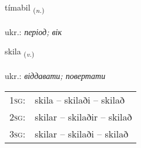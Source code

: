 \documentclass[frontgrid, backgrid]{flacards}\usepackage[]{graphicx}\usepackage[]{xcolor}
\begin{document}
\renewcommand{\flhead}{\vskip5pt \fboxsep=0pt {\small\bfseries\footnotesize Nafnorð | іменник}}
\renewcommand{\fcfoot}{\vskip5pt \fboxsep=0pt \hspace{2pt}{\small\bfseries\footnotesize 1K}}

\renewcommand{\blhead}{\vskip5pt {\small\bfseries\footnotesize Nafnorð | іменник }}
\renewcommand{\bcfoot}{\vskip5pt \hspace{2pt}{\small\bfseries\footnotesize 1K}}


{tímabil \small{\textsubscript{(\textit{n.})}} \\[1ex] %
\textphonetic{[tʰiːmapɪl]} \\
ukr.: \emph{період; вік} \\  [2ex]
\renewcommand*{\arraystretch}{0.8}
}

\renewcommand{\flhead}{\vskip5pt \fboxsep=0pt {\small\bfseries\footnotesize Sagnorð | дієслово}}
\renewcommand{\fcfoot}{\vskip5pt \fboxsep=0pt \hspace{2pt}{\small\bfseries\footnotesize 1K}}

\renewcommand{\blhead}{\vskip5pt {\small\bfseries\footnotesize Sagnorð | дієслово }}
\renewcommand{\bcfoot}{\vskip5pt \hspace{2pt}{\small\bfseries\footnotesize 1K}}


{skila \small{\textsubscript{(\textit{v.})}} \\[1ex] %
\textphonetic{[scɪːla]} \\
ukr.: \emph{віддавати; повертати} \\  [2ex]
\renewcommand*{\arraystretch}{0.8}
\begin{tabular}{p{1cm}l}
\textsc{1sg}: & skila -- skilaði -- skilað \\ 
\textsc{2sg}: & skilar -- skilaðir -- skilað \\ 
\textsc{3sg}: & skilar -- skilaði -- skilað \\ 
\end{tabular}
}
\end{document}
